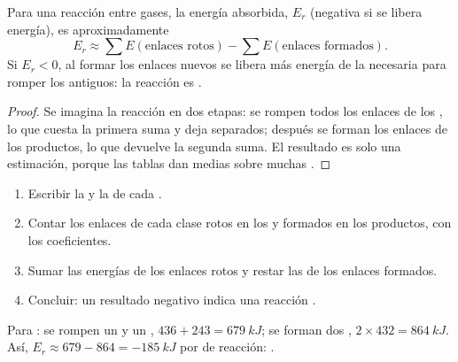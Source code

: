 \begin{proposition}\label{prop:g11:reaction-energy:estimate}
Para una reacción entre gases, la energía absorbida, $E_r$ (negativa si
se libera energía), es aproximadamente
\[
  E_r \approx \sum E(\text{enlaces rotos}) - \sum E(\text{enlaces formados}) .
\]
Si $E_r < 0$, al formar los enlaces nuevos se libera más energía de la
necesaria para romper los antiguos: la reacción es .
\end{proposition}

\begin{proof}
Se imagina la reacción en dos etapas: se rompen todos los enlaces de los
, lo que cuesta la primera suma y deja  separados; después
se forman los enlaces de los productos, lo que devuelve la segunda suma.
El resultado es solo una estimación, porque las tablas dan medias sobre
muchas .
\end{proof}

\begin{method}\label{met:g11:reaction-energy:bonds}
\begin{enumerate}
  \item Escribir la  y la  de cada
        .
  \item Contar los enlaces de cada clase rotos en los  y
        formados en los productos, con los coeficientes.
  \item Sumar las energías de los enlaces rotos y restar las de los
        enlaces formados.
  \item Concluir: un resultado negativo indica una reacción .
\end{enumerate}
\end{method}

\begin{example}\label{ex:g11:reaction-energy:hcl}
Para : se rompen un  y un ,
$436 + 243 = \qty{679}{kJ}$; se forman dos , $2 \times 432 =
\qty{864}{kJ}$. Así, $E_r \approx 679 - 864 = \qty{-185}{kJ}$ por  de
reacción: .
\end{example}


